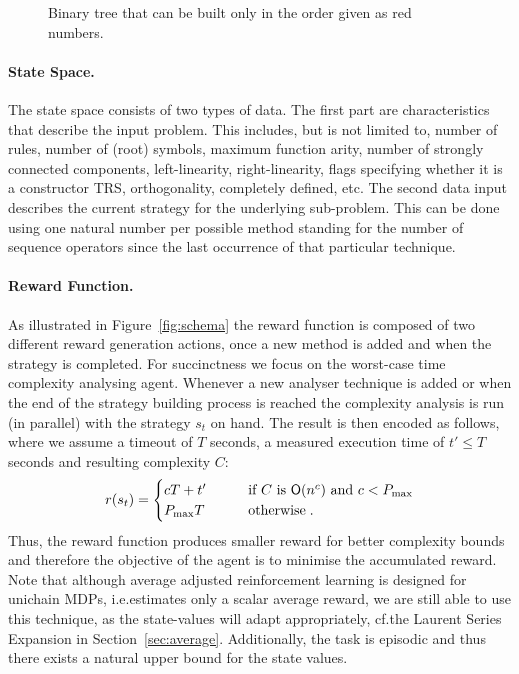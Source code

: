 \documentclass[envcountsame]{llncs}
\begin{document}
\begin{figure*}[t!]
  \centering
  \caption{\label{fig:binary}Binary tree that can be built only in the order given as red numbers.}
\end{figure*}

\paragraph{State Space.} The state space consists of two types of data. The first part are
characteristics that describe the input problem. This includes, but is not limited to, number of
rules, number of (root) symbols, maximum function arity, number of strongly connected components,
left-linearity, right-linearity, flags specifying whether it is a constructor TRS, orthogonality,
completely defined, etc. The second data input describes the current strategy for the underlying
sub-problem. This can be done using one natural number per possible method standing for the number
of sequence operators since the last occurrence of that particular technique.

\paragraph{Reward Function.} As illustrated in Figure~\ref{fig:schema} the reward function is
composed of two different reward generation actions, once a new method is added and when the
strategy is completed. %
For succinctness we focus on the worst-case time complexity analysing agent. Whenever a new analyser
technique is added or when the end of the strategy building process is reached the complexity
analysis is run (in parallel) with the strategy \(s_{t}\) on hand. The result is then encoded as
follows, where we assume a timeout of \(T\) seconds, a measured execution time of \(t' \leqslant T\)
seconds and resulting complexity \(C\):
\begin{align*}
  r(s_{t}) =
  \begin{cases}
     c T + t'    & \qquad   \text{if $C$ is }\bO(n^{c}) \text{ and } c < P_{\max}\\
     P_{\max} T  & \qquad  \text{otherwise}\tpkt
  \end{cases}
\end{align*}
Thus, the reward function produces smaller reward for better complexity bounds and therefore the
objective of the agent is to minimise the accumulated reward. Note that although average adjusted
reinforcement learning is designed for unichain MDPs, i.e.\@ estimates only a scalar average reward,
we are still able to use this technique, as the state-values will adapt appropriately, cf.\@ the
Laurent Series Expansion in Section~\ref{sec:average}. Additionally, the task is episodic and thus
there exists a natural upper bound for the state values.
\end{document}
